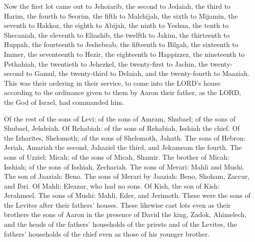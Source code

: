 \myverse{}Now the first lot came out to Jehoiarib, the second to Jedaiah,
\myverse{}the third to Harim, the fourth to Seorim,
\myverse{}the fifth to Malchijah, the sixth to Mijamin,
\myverse{}the seventh to Hakkoz, the eighth to Abijah,
\myverse{}the ninth to Yeshua, the tenth to Shecaniah,
\myverse{}the eleventh to Eliashib, the twelfth to Jakim,
\myverse{}the thirteenth to Huppah, the fourteenth to Jeshebeab,
\myverse{}the fifteenth to Bilgah, the sixteenth to Immer,
\myverse{}the seventeenth to Hezir, the eighteenth to Happizzez,
\myverse{}the nineteenth to Pethahiah, the twentieth to Jehezkel,
\myverse{}the twenty-first to Jachin, the twenty-second to Gamul,
\myverse{}the twenty-third to Delaiah, and the twenty-fourth to Maaziah.
\myverse{}This was their ordering in their service, to come into the LORD’s house according
to the ordinance given to them by Aaron their father, as the LORD, the God of Israel, had commanded him.

\myverse{}Of the rest of the sons of Levi: of the sons of Amram, Shubael;
of the sons of Shubael, Jehdeiah.
\myverse{}Of Rehabiah: of the sons of Rehabiah, Isshiah the chief.
\myverse{}Of the Izharites, Shelomoth; of the sons of Shelomoth, Jahath.
\myverse{}The sons of Hebron: Jeriah, Amariah the second, Jahaziel the third, and Jekameam
the fourth.
\myverse{}The sons of Uzziel: Micah; of the sons of Micah, Shamir.
\myverse{}The brother of Micah: Isshiah; of the sons of Isshiah, Zechariah.
\myverse{}The sons of Merari: Mahli and Mushi. The son of Jaaziah: Beno.
\myverse{}The sons of Merari by Jaaziah: Beno, Shoham, Zaccur, and Ibri.
\myverse{}Of Mahli: Eleazar, who had no sons.
\myverse{}Of Kish, the son of Kish: Jerahmeel.
\myverse{}The sons of Mushi: Mahli, Eder, and Jerimoth. These were the sons of the
Levites after their fathers’ houses.
\myverse{}These likewise cast lots even as their brothers the sons of Aaron in the
presence of David the king, Zadok, Ahimelech, and the heads of the fathers’ households of the priests
and of the Levites, the fathers’ households of the chief even as those of his younger brother.


